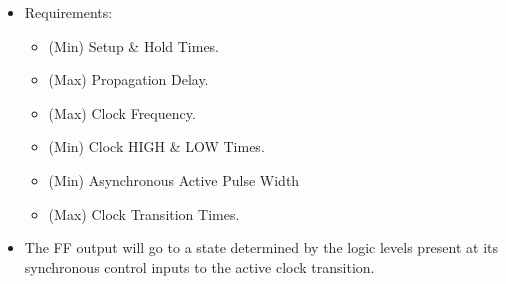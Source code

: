 \begin{multicols}{4}
    \begin{itemize}
      \item Requirements:
        \begin{itemize}
          \item (Min) Setup \& Hold Times.
          \item (Max) Propagation Delay.
          \item (Max) Clock Frequency.
          \item (Min) Clock HIGH \& LOW Times.
          \item (Min) Asynchronous Active Pulse Width 
          \item (Max) Clock Transition Times.
        \end{itemize}
      \item The FF output will go to a state determined by the
        logic levels present at its synchronous control inputs
         to the active clock transition.
    \end{itemize}

\end{multicols}